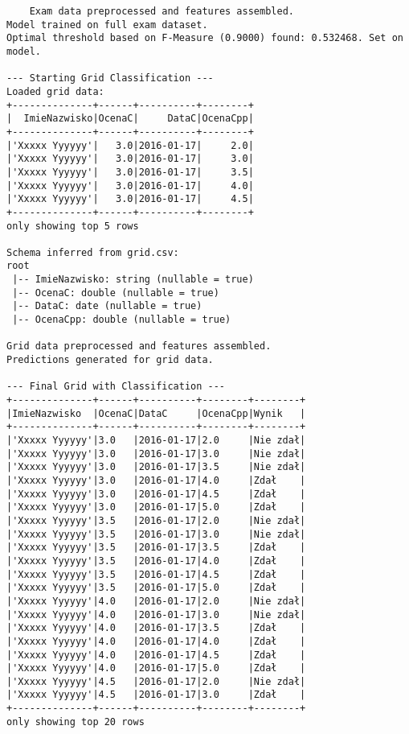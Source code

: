 \documentclass{article}
\begin{document}
\begin{verbatim}
    Exam data preprocessed and features assembled.
Model trained on full exam dataset.
Optimal threshold based on F-Measure (0.9000) found: 0.532468. Set on model.

--- Starting Grid Classification --- 
Loaded grid data:
+--------------+------+----------+--------+
|  ImieNazwisko|OcenaC|     DataC|OcenaCpp|
+--------------+------+----------+--------+
|'Xxxxx Yyyyyy'|   3.0|2016-01-17|     2.0|
|'Xxxxx Yyyyyy'|   3.0|2016-01-17|     3.0|
|'Xxxxx Yyyyyy'|   3.0|2016-01-17|     3.5|
|'Xxxxx Yyyyyy'|   3.0|2016-01-17|     4.0|
|'Xxxxx Yyyyyy'|   3.0|2016-01-17|     4.5|
+--------------+------+----------+--------+
only showing top 5 rows

Schema inferred from grid.csv:
root
 |-- ImieNazwisko: string (nullable = true)
 |-- OcenaC: double (nullable = true)
 |-- DataC: date (nullable = true)
 |-- OcenaCpp: double (nullable = true)

Grid data preprocessed and features assembled.
Predictions generated for grid data.

--- Final Grid with Classification ---
+--------------+------+----------+--------+--------+
|ImieNazwisko  |OcenaC|DataC     |OcenaCpp|Wynik   |
+--------------+------+----------+--------+--------+
|'Xxxxx Yyyyyy'|3.0   |2016-01-17|2.0     |Nie zdał|
|'Xxxxx Yyyyyy'|3.0   |2016-01-17|3.0     |Nie zdał|
|'Xxxxx Yyyyyy'|3.0   |2016-01-17|3.5     |Nie zdał|
|'Xxxxx Yyyyyy'|3.0   |2016-01-17|4.0     |Zdał    |
|'Xxxxx Yyyyyy'|3.0   |2016-01-17|4.5     |Zdał    |
|'Xxxxx Yyyyyy'|3.0   |2016-01-17|5.0     |Zdał    |
|'Xxxxx Yyyyyy'|3.5   |2016-01-17|2.0     |Nie zdał|
|'Xxxxx Yyyyyy'|3.5   |2016-01-17|3.0     |Nie zdał|
|'Xxxxx Yyyyyy'|3.5   |2016-01-17|3.5     |Zdał    |
|'Xxxxx Yyyyyy'|3.5   |2016-01-17|4.0     |Zdał    |
|'Xxxxx Yyyyyy'|3.5   |2016-01-17|4.5     |Zdał    |
|'Xxxxx Yyyyyy'|3.5   |2016-01-17|5.0     |Zdał    |
|'Xxxxx Yyyyyy'|4.0   |2016-01-17|2.0     |Nie zdał|
|'Xxxxx Yyyyyy'|4.0   |2016-01-17|3.0     |Nie zdał|
|'Xxxxx Yyyyyy'|4.0   |2016-01-17|3.5     |Zdał    |
|'Xxxxx Yyyyyy'|4.0   |2016-01-17|4.0     |Zdał    |
|'Xxxxx Yyyyyy'|4.0   |2016-01-17|4.5     |Zdał    |
|'Xxxxx Yyyyyy'|4.0   |2016-01-17|5.0     |Zdał    |
|'Xxxxx Yyyyyy'|4.5   |2016-01-17|2.0     |Nie zdał|
|'Xxxxx Yyyyyy'|4.5   |2016-01-17|3.0     |Zdał    |
+--------------+------+----------+--------+--------+
only showing top 20 rows
\end{verbatim}
\end{document}
